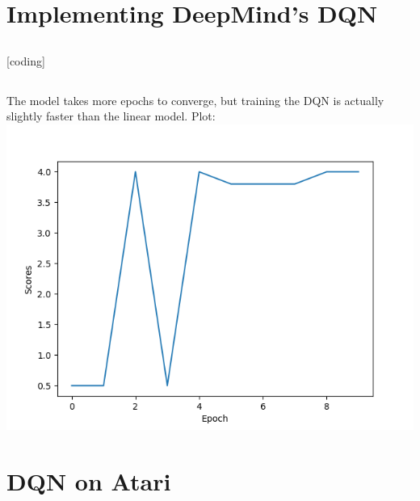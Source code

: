 \documentclass[10pt,a4paper]{article}
\begin{document}
  \section{Implementing DeepMind's DQN}
  
  \subsection{}
  [coding]
  
  \subsection{}
  The model takes more epochs to converge, but training the DQN is actually slightly faster than the linear model.  Plot: \\
  \includegraphics[scale=0.5]{scores_q3_nature.png}  
  
  \section{DQN on Atari}
  
\end{document}
